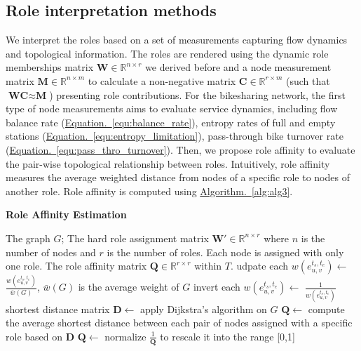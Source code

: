 \documentclass[a4paper,fleqn]{cas-sc}
\begin{document}
\subsection{Role interpretation methods}\label{role_inter_method}
We interpret the roles based on a set of measurements capturing flow dynamics and topological information. The roles are rendered using the dynamic role memberships matrix $\textbf{W}\in \mathbb{R}^{n\times r}$ we derived before and a node measurement matrix $\textbf{M}\in \mathbb{R}^{n\times m}$ to calculate a non-negative matrix $\textbf{C}\in \mathbb{R}^{r\times m}$ (such that $\textbf{WC} \approx \textbf{M}$) presenting role contributions. For the bikesharing network, the first type of node measurements aims to evaluate service dynamics, including flow balance rate (\hyperref[equ:balance_rate]{Equation.~\ref{equ:balance_rate}}), entropy rates of full and empty stations (\hyperref[equ:entropy_limitation]{Equation.~\ref{equ:entropy_limitation}}), pass-through bike turnover rate (\hyperref[equ:pass_thro_turnover]{Equation.~\ref{equ:pass_thro_turnover}}). Then, we propose role affinity to evaluate the pair-wise topological relationship between roles. Intuitively, role affinity measures the average weighted distance from nodes of a specific role to nodes of another role. Role affinity is computed using \hyperref[alg:alg3]{Algorithm.~\ref{alg:alg3}}.

\begin{algorithm}[!htb]
    \caption{\textbf{Role Affinity Estimation}}
    \label{alg:ALG3}
    \begin{algorithmic}
    \Require The graph $G$; The hard role assignment matrix $\mathbf{W'}\in \mathbb{R}^{n\times r}$ where $n$ is the number of nodes and $r$ is the number of roles. Each node is assigned with only one role.
    \Ensure The role affinity matrix $\mathbf{Q}\in \mathbb{R}^{r\times r}$ within $T$.
    \State udpate each $w(e_{u,v}^{t_{s},t_{e}})\gets$ $\frac{w(e_{u,v}^{t_{s},t_{e}})}{\bar w(G)}$, $\bar w(G)$ is the average weight of $G$
    \State invert each $w(e_{u,v}^{t_{s},t_{e}})\gets$ $\frac{1}{w(e_{u,v}^{t_{s},t_{e}})}$
    \State shortest distance matrix $\mathbf{D}\gets$ apply Dijkstra's algorithm on $G$
    \State $\mathbf{Q}\gets$ compute the average shortest distance between each pair of nodes assigned with a specific role based on $\mathbf{D}$
    \State $\mathbf{Q}\gets$ normalize $\frac{1}{\mathbf{Q}}$ to rescale it into the range [0,1]
    \end{algorithmic}\label{alg:alg3}
\end{algorithm}
\end{document}
